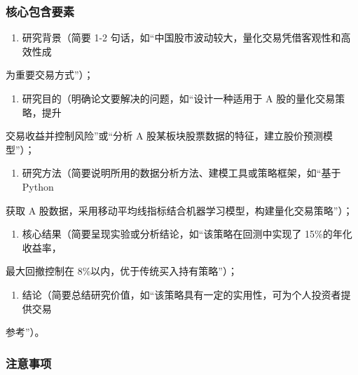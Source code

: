 \documentclass[
]{article}
\providecommand{\tightlist}{%
  \setlength{\itemsep}{0pt}\setlength{\parskip}{0pt}}
\begin{document}
\hypertarget{ux6838ux5fc3ux5305ux542bux8981ux7d20}{%
\subsubsection{\texorpdfstring{\textbf{核心包含要素}}{核心包含要素}}\label{ux6838ux5fc3ux5305ux542bux8981ux7d20}}

\begin{enumerate}
\def\labelenumi{\arabic{enumi}.}
\tightlist
\item
  研究背景（简要 1-2
  句话，如``中国股市波动较大，量化交易凭借客观性和高效性成
\end{enumerate}

为重要交易方式''）；

\begin{enumerate}
\def\labelenumi{\arabic{enumi}.}
\setcounter{enumi}{1}
\tightlist
\item
  研究目的（明确论文要解决的问题，如``设计一种适用于 A
  股的量化交易策略，提升
\end{enumerate}

交易收益并控制风险''或``分析 A
股某板块股票数据的特征，建立股价预测模型''）；

\begin{enumerate}
\def\labelenumi{\arabic{enumi}.}
\setcounter{enumi}{2}
\tightlist
\item
  研究方法（简要说明所用的数据分析方法、建模工具或策略框架，如``基于
  Python
\end{enumerate}

获取 A
股数据，采用移动平均线指标结合机器学习模型，构建量化交易策略''）；

\begin{enumerate}
\def\labelenumi{\arabic{enumi}.}
\setcounter{enumi}{3}
\tightlist
\item
  核心结果（简要呈现实验或分析结论，如``该策略在回测中实现了
  15\%的年化收益率，
\end{enumerate}

最大回撤控制在 8\%以内，优于传统买入持有策略''）；

\begin{enumerate}
\def\labelenumi{\arabic{enumi}.}
\setcounter{enumi}{4}
\tightlist
\item
  结论（简要总结研究价值，如``该策略具有一定的实用性，可为个人投资者提供交易
\end{enumerate}

参考''）。

\hypertarget{ux6ce8ux610fux4e8bux9879}{%
\subsubsection{\texorpdfstring{\textbf{注意事项}}{注意事项}}\label{ux6ce8ux610fux4e8bux9879}}
\end{document}
